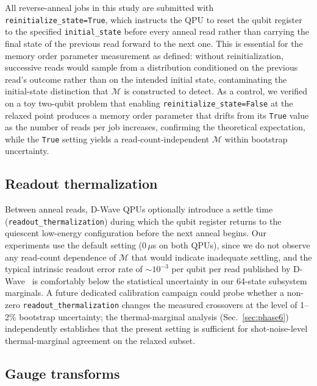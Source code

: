 \documentclass[aps,prapplied,reprint,superscriptaddress,floatfix,nofootinbib]{revtex4-2}
\begin{document}
All reverse-anneal jobs in this study are submitted with \texttt{reinitialize\_state=True}, which instructs the QPU to reset the qubit register to the specified \texttt{initial\_state} before every anneal read rather than carrying the final state of the previous read forward to the next one.
This is essential for the memory order parameter measurement as defined: without reinitialization, successive reads would sample from a distribution conditioned on the previous read's outcome rather than on the intended initial state, contaminating the initial-state distinction that $\mathcal{M}$ is constructed to detect.
As a control, we verified on a toy two-qubit problem that enabling \texttt{reinitialize\_state=False} at the relaxed point produces a memory order parameter that drifts from its \texttt{True} value as the number of reads per job increases, confirming the theoretical expectation, while the \texttt{True} setting yields a read-count-independent $\mathcal{M}$ within bootstrap uncertainty.

\subsection{Readout thermalization}
\label{sec:readout}

Between anneal reads, D-Wave QPUs optionally introduce a settle time (\texttt{readout\_thermalization}) during which the qubit register returns to the quiescent low-energy configuration before the next anneal begins.
Our experiments use the default setting (0\,$\mu$s on both QPUs), since we do not observe any read-count dependence of $\mathcal{M}$ that would indicate inadequate settling, and the typical intrinsic readout error rate of $\sim\!10^{-3}$ per qubit per read published by D-Wave~\cite{dwave2024system_docs} is comfortably below the statistical uncertainty in our 64-state subsystem marginals.
A future dedicated calibration campaign could probe whether a non-zero \texttt{readout\_thermalization} changes the measured crossovers at the level of 1--2\% bootstrap uncertainty; the thermal-marginal analysis (Sec.~\ref{sec:phase6}) independently establishes that the present setting is sufficient for shot-noise-level thermal-marginal agreement on the relaxed subset.

\subsection{Gauge transforms}
\label{sec:gauge}
\end{document}
